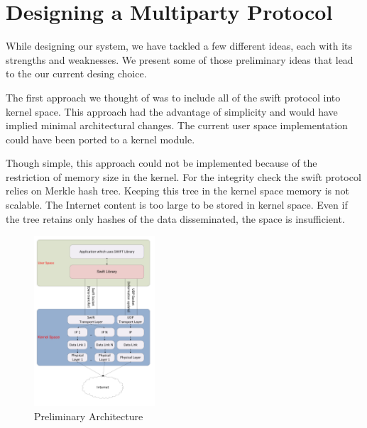 
\section{Designing a Multiparty Protocol}
\label{sec:multiparty:design}


While designing our system, we have tackled a few different ideas, each with
its strengths and weaknesses. We present some of those preliminary ideas
that lead to the our current desing choice.

The first approach we thought of was to include all of the swift protocol into
kernel space. This approach had the advantage of simplicity and would have
implied minimal architectural changes. The current user space implementation
could have been ported to a kernel module.

Though simple, this approach could not be implemented because of the
restriction of memory size in the kernel.  For the integrity check the swift
protocol relies on Merkle hash tree. Keeping this tree in the kernel space
memory is not scalable. The Internet content is too large to be stored in
kernel space. Even if the tree retains only hashes of the data disseminated, the
space is insufficient.

\begin{figure}
  \centering
  \includegraphics[width=0.4\textwidth]{src/img/multiparty/preliminary-architecture}
  \caption{Preliminary Architecture}
  \label{fig:multiparty:preliminary-architecture}
\end{figure}


